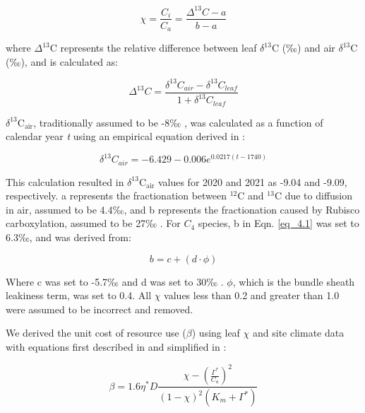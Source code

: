     \begin{equation} 
        \label{eq_4.1}
        \chi=\frac{C_{i}}{C_{a}}=\frac{\Delta^{13}C - a}{b - a}
    \end{equation}
    
    \noindent where $\Delta^{13}$C represents the relative difference between leaf $\delta^{13}$C (‰) and air $\delta^{13}$C (‰), and is calculated as:

    \begin{equation}
        \label{eq_4.2}
        \Delta^{13}C = \frac{\delta^{13}C_{air} - \delta^{13}C_{leaf}}{1 + \delta^{13}C_{leaf}}
    \end{equation}

    \noindent $\delta^{13}\mathrm{C_{air}}$, traditionally assumed to be -8‰ , was calculated as a function of calendar year \textit{t} using an empirical equation derived in :

    \begin{equation}
        \label{eq_4.3}
        \delta^{13}C_{air} = -6.429 - 0.006e^{0.0217(t-1740)}
    \end{equation}
    
    \noindent This calculation resulted in $\delta^{13}\mathrm{C_{air}}$ values for 2020 and 2021 as -9.04 and -9.09, respectively. a represents the fractionation between $^{12}\mathrm{C}$ and $^{13}\mathrm{C}$ due to diffusion in air, assumed to be 4.4‰, and b represents the fractionation caused by Rubisco carboxylation, assumed to be 27‰ . For $C_{4}$ species, b in Eqn. \ref{eq_4.1} was set to 6.3‰, and was derived from:

    \begin{equation}
        \label{eq_4.4}
        b = c + (d \cdot \phi)
    \end{equation}
    
    \noindent Where c was set to -5.7‰ and d was set to 30‰ . $\phi$, which is the bundle sheath leakiness term, was set to 0.4. All $\chi$ values less than 0.2 and greater than 1.0 were assumed to be incorrect and removed.
    
    We derived the unit cost of resource use ($\beta$) using leaf $\chi$ and site climate data with equations first described in  and simplified in :

    \begin{equation}
        \label{eq_4.5}
        \beta = 1.6\eta^{*} D \frac{\chi - (\frac{\Gamma^*}{C_{a}})^{2}}{(1 - \chi)^{2}(K_{m} + \Gamma^{*})}
    \end{equation}
    
